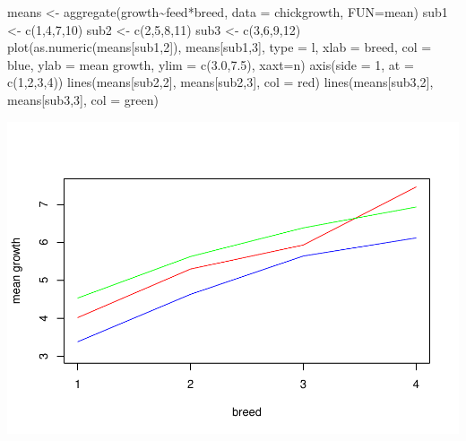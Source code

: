 \documentclass[
]{book}
\newenvironment{Shaded}{\begin{snugshade}}{\end{snugshade}}
\newcommand{\AttributeTok}[1]{\textcolor[rgb]{0.77,0.63,0.00}{#1}}
\newcommand{\DecValTok}[1]{\textcolor[rgb]{0.00,0.00,0.81}{#1}}
\newcommand{\FloatTok}[1]{\textcolor[rgb]{0.00,0.00,0.81}{#1}}
\newcommand{\FunctionTok}[1]{\textcolor[rgb]{0.00,0.00,0.00}{#1}}
\newcommand{\NormalTok}[1]{#1}
\newcommand{\OtherTok}[1]{\textcolor[rgb]{0.56,0.35,0.01}{#1}}
\newcommand{\SpecialCharTok}[1]{\textcolor[rgb]{0.00,0.00,0.00}{#1}}
\newcommand{\StringTok}[1]{\textcolor[rgb]{0.31,0.60,0.02}{#1}}
\begin{document}
\begin{Shaded}
\begin{Highlighting}[]
\NormalTok{means }\OtherTok{\textless{}{-}} \FunctionTok{aggregate}\NormalTok{(growth}\SpecialCharTok{\textasciitilde{}}\NormalTok{feed}\SpecialCharTok{*}\NormalTok{breed, }\AttributeTok{data =}\NormalTok{ chickgrowth, }\AttributeTok{FUN=}\NormalTok{mean)}
\NormalTok{sub1 }\OtherTok{\textless{}{-}} \FunctionTok{c}\NormalTok{(}\DecValTok{1}\NormalTok{,}\DecValTok{4}\NormalTok{,}\DecValTok{7}\NormalTok{,}\DecValTok{10}\NormalTok{)}
\NormalTok{sub2 }\OtherTok{\textless{}{-}} \FunctionTok{c}\NormalTok{(}\DecValTok{2}\NormalTok{,}\DecValTok{5}\NormalTok{,}\DecValTok{8}\NormalTok{,}\DecValTok{11}\NormalTok{)}
\NormalTok{sub3 }\OtherTok{\textless{}{-}} \FunctionTok{c}\NormalTok{(}\DecValTok{3}\NormalTok{,}\DecValTok{6}\NormalTok{,}\DecValTok{9}\NormalTok{,}\DecValTok{12}\NormalTok{)}
\FunctionTok{plot}\NormalTok{(}\FunctionTok{as.numeric}\NormalTok{(means[sub1,}\DecValTok{2}\NormalTok{]), means[sub1,}\DecValTok{3}\NormalTok{], }\AttributeTok{type =} \StringTok{\textquotesingle{}l\textquotesingle{}}\NormalTok{, }\AttributeTok{xlab =} \StringTok{\textquotesingle{}breed\textquotesingle{}}\NormalTok{, }\AttributeTok{col =} \StringTok{\textquotesingle{}blue\textquotesingle{}}\NormalTok{, }\AttributeTok{ylab =} \StringTok{\textquotesingle{}mean growth\textquotesingle{}}\NormalTok{, }\AttributeTok{ylim =} \FunctionTok{c}\NormalTok{(}\FloatTok{3.0}\NormalTok{,}\FloatTok{7.5}\NormalTok{), }\AttributeTok{xaxt=}\StringTok{\textquotesingle{}n\textquotesingle{}}\NormalTok{)}
\FunctionTok{axis}\NormalTok{(}\AttributeTok{side =} \DecValTok{1}\NormalTok{, }\AttributeTok{at =} \FunctionTok{c}\NormalTok{(}\DecValTok{1}\NormalTok{,}\DecValTok{2}\NormalTok{,}\DecValTok{3}\NormalTok{,}\DecValTok{4}\NormalTok{))}
\FunctionTok{lines}\NormalTok{(means[sub2,}\DecValTok{2}\NormalTok{], means[sub2,}\DecValTok{3}\NormalTok{], }\AttributeTok{col =} \StringTok{\textquotesingle{}red\textquotesingle{}}\NormalTok{)}
\FunctionTok{lines}\NormalTok{(means[sub3,}\DecValTok{2}\NormalTok{], means[sub3,}\DecValTok{3}\NormalTok{], }\AttributeTok{col =} \StringTok{\textquotesingle{}green\textquotesingle{}}\NormalTok{)}
\end{Highlighting}
\end{Shaded}

\includegraphics{11-StrategyForAnalysis_files/figure-latex/unnamed-chunk-6-1.pdf}
\end{document}
